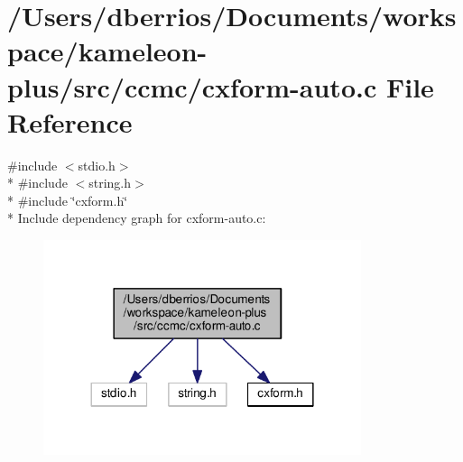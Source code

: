 \hypertarget{cxform-auto_8c}{\section{/\-Users/dberrios/\-Documents/workspace/kameleon-\/plus/src/ccmc/cxform-\/auto.c File Reference}
\label{cxform-auto_8c}
}
{\ttfamily \#include $<$stdio.\-h$>$}\\*
{\ttfamily \#include $<$string.\-h$>$}\\*
{\ttfamily \#include \char`\"{}cxform.\-h\char`\"{}}\\*
Include dependency graph for cxform-\/auto.c\-:
\nopagebreak
\begin{figure}[H]
\begin{center}
\leavevmode
\includegraphics[width=264pt]{cxform-auto_8c__incl}
\end{center}
\end{figure}
